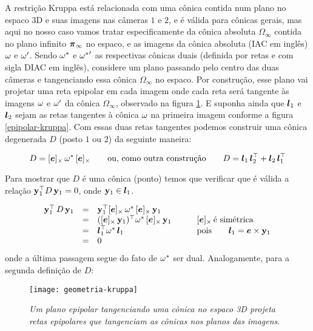 A restrição Kruppa está relacionada com uma cônica contida num plano no espaco 3D e suas imagens nas câmeras $1$ e $2$, e é válida para cônicas gerais, mas aqui no nosso caso vamos tratar especificamente da cônica absoluta $\Omega_\infty$ contida no plano infinito $\boldsymbol{\pi}_\infty$ no espaco, e as imagens da cônica absoluta (IAC em inglês) ${\bf \omega}$ e ${\bf \omega'}$. Sendo ${\bf \omega}^*$ e ${{\bf \omega}^*}'$ as respectivas cônicas duais (definida por retas e com sigla DIAC em inglês), considere um plano passando pelo centro das duas câmeras e tangenciando essa cônica $\Omega_\infty$ no espaco. Por construção, esse plano vai projetar uma reta epipolar em cada imagem onde cada reta será tangente às imagens ${\bf \omega}$ e ${\bf \omega'}$ da cônica $\Omega_\infty$, observado na figura \ref{geometria-kruppa}. E suponha ainda que $\boldsymbol{l}_1$ e $\boldsymbol{l}_2$ sejam as retas tangentes à cônica ${\bf \omega}$ na primeira imagem conforme a figura \ref{epipolar-kruppa}. Com essas duas retas tangentes podemos construir uma cônica degenerada $D$ (posto $1$ ou $2$) da seguinte maneira:  

\begin{equation}\label{eq.def.con.deg}
D=[\boldsymbol{e}]_\times\,{\bf \omega}^*\,[\boldsymbol{e}]_\times \qquad \text{ou, como outra construção} \qquad D=\boldsymbol{l}_1\,\boldsymbol{l}_2^\top + \boldsymbol{l}_2\,\boldsymbol{l}_1^\top
\end{equation}

Para mostrar que $D$ é uma cônica (ponto) temos que verificar que é válida a relação ${\bf y}_1^\top D\,{\bf y}_1=0$, onde ${\bf y}_1\in\boldsymbol{l}_1$.

\begin{equation*}
\begin{array}{rcll}
{\bf y}_1^\top\,D\,{\bf y}_1&=&{\bf y}_1^\top [\boldsymbol{e}]_\times\,{\bf \omega}^*\,[\boldsymbol{e}]_\times\,{\bf y}_1&\\
&=&([\boldsymbol{e}]_\times\,{\bf y}_1)^\top {\bf \omega}^*\,[\boldsymbol{e}]_\times\,{\bf y}_1& \qquad [\boldsymbol{e}]_\times\,\text{é simétrica}\\
&=&\boldsymbol{l}_1^\top {\bf \omega}^*\,\boldsymbol{l}_1& \qquad\text{pois}\qquad\boldsymbol{l}_1=\boldsymbol{e}\times{\bf y}_1\\
&=&0&
\end{array}
\end{equation*}
onde a última passagem segue do fato de ${\bf \omega}^*$ ser dual. Analogamente, para a segunda definição de $D$:

\begin{figure}[!htb]
\centering
\texttt{[image: geometria-kruppa]}
\caption{\textit{Um plano epipolar tangenciando uma cônica no espaco 3D projeta retas epipolares que tangenciam as cônicas nos planos das imagens}.}
\label{geometria-kruppa}
\end{figure}

